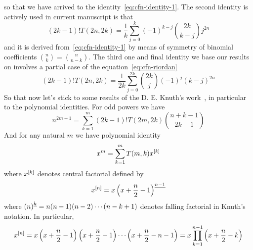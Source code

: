 so that we have arrived to the identity~\eqref{eq:cfn-identity-1}.
The second identity is actively used in current manuscript is that
\begin{equation}
(2k-1)
    !T(2n,2k) = \frac{1}{k} \sum_{j=0}^{k} (-1)^{k-j} \binom{2k}{k-j} j^{2n}\label{eq:cfn-identity-2}
\end{equation}
and it is derived from~\eqref{eq:cfn-identity-1} by means
of symmetry of binomial coefficients $\binom{n}{k} = \binom{n}{n-k}$.
The third one and final identity we base our results on involves a partial case of the equation~\eqref{eq:cfn-riordan}
\begin{equation}
(2k-1)
    !T(2n, 2k) = \frac{1}{2k} \sum_{j=0}^{2k} \binom{2k}{j} (-1)^{j} (k-j)^{2n}\label{eq:cfn-identity-3}
\end{equation}
So that now let's stick to some results of the D. E. Knuth's work~\cite{knuth1993johann},
in particular to the polynomial identities.
For odd powers we have
\begin{equation}
    n^{2m-1} = \sum_{k=1}^{m} (2k-1)! T(2m,2k) \binom{n+k-1}{2k-1}\label{eq:knuth-odd-power}
\end{equation}
And for any natural $m$ we have polynomial identity
\begin{equation}
    x^m = \sum_{k=1}^{m} T(m, k) x^{[k]}\label{eq:knuth-power-identity}
\end{equation}
where $x^{[k]}$ denotes central factorial defined by
\begin{equation*}
    x^{[n]} = x \left(x+\frac{n}{2}-1 \right)^{\underline{n-1}}
\end{equation*}
where $\left(n \right)^{\underline{k}} = n (n-1) (n-2) \cdots (n-k+1)$ denotes falling factorial in Knuth's notation.
In particular,
\begin{equation*}
    x^{[n]}
    = x \left( x+\frac{n}{2}-1 \right) \left( x+\frac{n}{2}-1 \right) \cdots \left (x+\frac{n}{2}-n-1 \right)
    = x \prod_{k=1}^{n-1} \left( x+\frac{n}{2}-k \right)
\end{equation*}